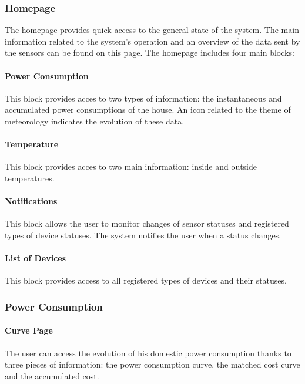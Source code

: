      
\subsubsection{Homepage}

The homepage provides quick access to the general state of the system.
The main information related to the system's operation and an overview of the data sent by the sensors can be found on this page.
The homepage includes four main blocks:%
    \paragraph{Power Consumption} 
    This block provides acces to two types of information: the instantaneous and accumulated power consumptions of the house. An icon related to the theme of meteorology indicates the evolution of these data. %
    \paragraph{Temperature}
    This block provides acces to two main information: inside and outside temperatures.
    \paragraph{Notifications}
    This block allows the user to monitor changes of sensor statuses and registered types of device statuses. The system notifies the user when a status changes.
    \paragraph{List of Devices} %
    This block provides access to all registered types of devices and their statuses.

\subsubsection{Power Consumption}

    \paragraph{Curve Page}
    The user can access the evolution of his domestic power consumption thanks to three pieces of information: the power consumption curve, the matched cost curve and the accumulated cost.
    
